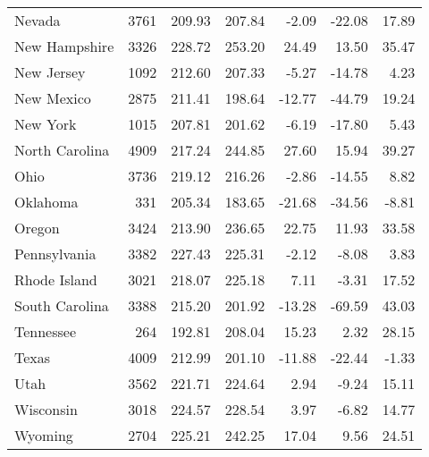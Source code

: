 \begin{table}[ht]
\begin{center}
\begin{tabular}{lrrrrrr}
  Nevada & 3761 & 209.93 & 207.84 & -2.09 & -22.08 & 17.89 \\ 
  New Hampshire & 3326 & 228.72 & 253.20 & 24.49 & 13.50 & 35.47 \\ 
  New Jersey & 1092 & 212.60 & 207.33 & -5.27 & -14.78 & 4.23 \\ 
  New Mexico & 2875 & 211.41 & 198.64 & -12.77 & -44.79 & 19.24 \\ 
  New York & 1015 & 207.81 & 201.62 & -6.19 & -17.80 & 5.43 \\ 
  North Carolina & 4909 & 217.24 & 244.85 & 27.60 & 15.94 & 39.27 \\ 
  Ohio & 3736 & 219.12 & 216.26 & -2.86 & -14.55 & 8.82 \\ 
  Oklahoma & 331 & 205.34 & 183.65 & -21.68 & -34.56 & -8.81 \\ 
  Oregon & 3424 & 213.90 & 236.65 & 22.75 & 11.93 & 33.58 \\ 
  Pennsylvania & 3382 & 227.43 & 225.31 & -2.12 & -8.08 & 3.83 \\ 
  Rhode Island & 3021 & 218.07 & 225.18 & 7.11 & -3.31 & 17.52 \\ 
  South Carolina & 3388 & 215.20 & 201.92 & -13.28 & -69.59 & 43.03 \\ 
  Tennessee & 264 & 192.81 & 208.04 & 15.23 & 2.32 & 28.15 \\ 
  Texas & 4009 & 212.99 & 201.10 & -11.88 & -22.44 & -1.33 \\ 
  Utah & 3562 & 221.71 & 224.64 & 2.94 & -9.24 & 15.11 \\ 
  Wisconsin & 3018 & 224.57 & 228.54 & 3.97 & -6.82 & 14.77 \\ 
  Wyoming & 2704 & 225.21 & 242.25 & 17.04 & 9.56 & 24.51 \\ 
   \hline
\end{tabular}
\end{center}
\end{table}
